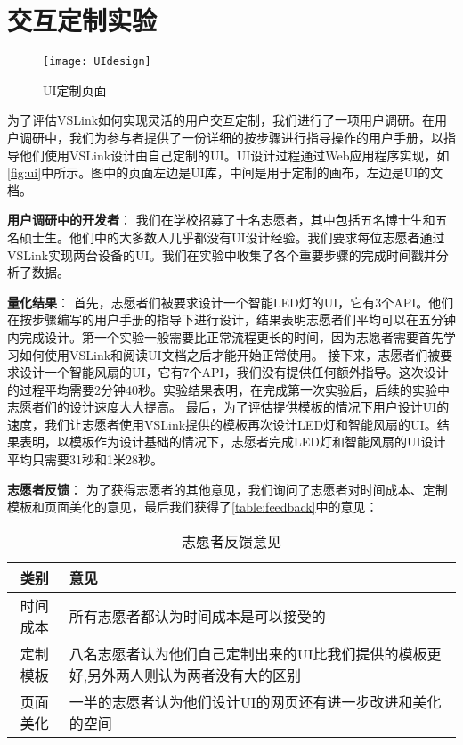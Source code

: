 \section{交互定制实验}

\begin{figure*}[htbp]
	\centering
	\texttt{[image: UIdesign]}
	\caption{UI定制页面}
	\label{fig:ui}
\end{figure*}

为了评估VSLink如何实现灵活的用户交互定制，我们进行了一项用户调研。在用户调研中，我们为参与者提供了一份详细的按步骤进行指导操作的用户手册，以指导他们使用VSLink设计由自己定制的UI。UI设计过程通过Web应用程序实现，如\autoref{fig:ui}中所示。图中的页面左边是UI库，中间是用于定制的画布，左边是UI的文档。

\textbf{用户调研中的开发者}： 
我们在学校招募了十名志愿者，其中包括五名博士生和五名硕士生。他们中的大多数人几乎都没有UI设计经验。我们要求每位志愿者通过VSLink实现两台设备的UI。我们在实验中收集了各个重要步骤的完成时间戳并分析了数据。


\textbf{量化结果}： 
首先，志愿者们被要求设计一个智能LED灯的UI，它有3个API。他们在按步骤编写的用户手册的指导下进行设计，结果表明志愿者们平均可以在五分钟内完成设计。第一个实验一般需要比正常流程更长的时间，因为志愿者需要首先学习如何使用VSLink和阅读UI文档之后才能开始正常使用。
接下来，志愿者们被要求设计一个智能风扇的UI，它有7个API，我们没有提供任何额外指导。这次设计的过程平均需要2分钟40秒。实验结果表明，在完成第一次实验后，后续的实验中志愿者们的设计速度大大提高。
最后，为了评估提供模板的情况下用户设计UI的速度，我们让志愿者使用VSLink提供的模板再次设计LED灯和智能风扇的UI。结果表明，以模板作为设计基础的情况下，志愿者完成LED灯和智能风扇的UI设计平均只需要31秒和1米28秒。

\textbf{志愿者反馈}：
为了获得志愿者的其他意见，我们询问了志愿者对时间成本、定制模板和页面美化的意见，最后我们获得了\autoref{table:feedback}中的意见：
\begin{table}[htbp]
    \caption{\label{table:feedback}志愿者反馈意见}
    \begin{tabularx}{\linewidth}{|c|X|}
        \hline
        类别 & 意见 \\ \hline
        时间成本 & 所有志愿者都认为时间成本是可以接受的 \\ \hline
        定制模板 & 八名志愿者认为他们自己定制出来的UI比我们提供的模板更好,另外两人则认为两者没有大的区别 \\ \hline
        页面美化 & 一半的志愿者认为他们设计UI的网页还有进一步改进和美化的空间 \\ \hline
    \end{tabularx}
\end{table}



